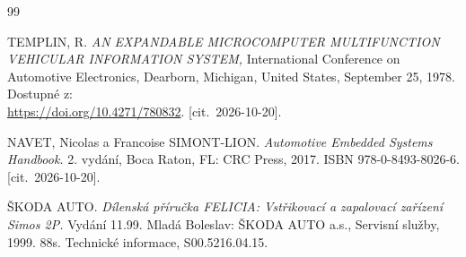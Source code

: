

\begin{thebibliography}{99}
	
    TEMPLIN, R.
    \emph{AN EXPANDABLE MICROCOMPUTER MULTIFUNCTION VEHICULAR INFORMATION SYSTEM,}
    International Conference on Automotive Electronics, Dearborn, Michigan, United States, September 25, 1978.
    Dostupné z:\\
 	\small
 	\url{https://doi.org/10.4271/780832}. [cit.\ 2026-10-20].

    NAVET, Nicolas a Francoise SIMONT-LION.
 	\emph{Automotive Embedded Systems Handbook. }
    2. vydání, Boca Raton, FL: CRC Press, 2017.
    ISBN 978-0-8493-8026-6.
 	[cit.\ 2026-10-20].

ŠKODA AUTO. \emph{Dílenská příručka FELICIA: Vstřikovací a zapalovací zařízení Simos 2P.} Vydání 11.99. Mladá Boleslav: ŠKODA AUTO a.s., Servisní služby, 1999. 88s. 
Technické informace, S00.5216.04.15.










\end{thebibliography}


